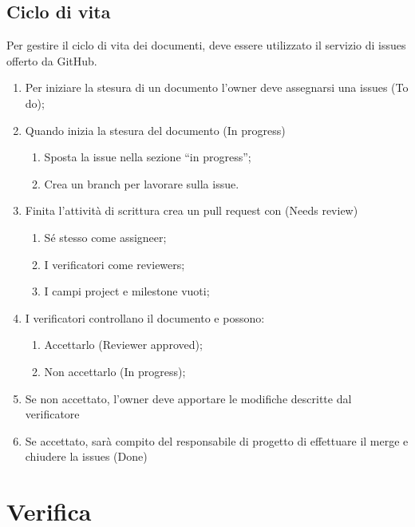 \subsection{Ciclo di vita}
Per gestire il ciclo di vita dei documenti, deve essere utilizzato il servizio di issues offerto da GitHub.
\begin{enumerate}
\item Per iniziare la stesura di un documento l’owner deve assegnarsi una issues (To do);
\item Quando inizia la stesura del documento (In progress)
	\begin{enumerate}
		\item Sposta la issue nella sezione “in progress”;
		\item Crea un branch per lavorare sulla issue.
	\end{enumerate}
\item Finita l’attività di scrittura crea un pull request con (Needs review)
	\begin{enumerate}
		\item Sé stesso come assigneer;
		\item I verificatori come reviewers;
		\item I campi project e milestone vuoti;
	\end{enumerate} 
\item I verificatori controllano il documento e possono:
	\begin{enumerate}
	 	\item Accettarlo (Reviewer approved);
	 	\item Non accettarlo (In progress);
	\end{enumerate}
\item Se non accettato, l’owner deve apportare le modifiche descritte dal verificatore
\item Se accettato, sarà compito del responsabile di progetto di effettuare il merge e chiudere la issues (Done)
\end{enumerate}









\section{Verifica}

